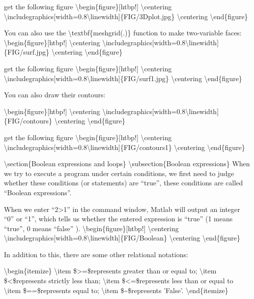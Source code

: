 \documentclass[10pt,math=newtx,citestyle=gb7714-2015,bibstyle=gb7714-2015]{elegantbook}
\begin{document}
	get the following figure
	\textbackslash{}begin\{figure\}[htbp!]
	\textbackslash{}centering
	\textbackslash{}includegraphics[width=0.8\textbackslash{}linewidth]\{FIG/3Dplot.jpg\}
	\textbackslash{}centering
	\textbackslash{}end\{figure\}
	
	You can also use the \textbackslash{}textbf\{meshgrid(.)\} function to make two-variable faces:
	\textbackslash{}begin\{figure\}[htbp!]
	\textbackslash{}centering
	\textbackslash{}includegraphics[width=0.8\textbackslash{}linewidth]\{FIG/surf.jpg\}
	\textbackslash{}centering
	\textbackslash{}end\{figure\}
	
	get the following figure
	\textbackslash{}begin\{figure\}[htbp!]
	\textbackslash{}centering
	\textbackslash{}includegraphics[width=0.8\textbackslash{}linewidth]\{FIG/surf1.jpg\}
	\textbackslash{}centering
	\textbackslash{}end\{figure\}
	
	You can also draw their contours:
	
	\textbackslash{}begin\{figure\}[htbp!]
	\textbackslash{}centering
	\textbackslash{}includegraphics[width=0.8\textbackslash{}linewidth]\{FIG/contours\}
	\textbackslash{}centering
	\textbackslash{}end\{figure\}
	
	get the following figure
	\textbackslash{}begin\{figure\}[htbp!]
	\textbackslash{}centering
	\textbackslash{}includegraphics[width=0.8\textbackslash{}linewidth]\{FIG/contours1\}
	\textbackslash{}centering
	\textbackslash{}end\{figure\}
	
	\textbackslash{}section\{Boolean expressions and loops\}
	\textbackslash{}subsection\{Boolean expressions\}
	When we try to execute a program under certain conditions, we first need to judge whether these conditions (or statements) are ``true'', these conditions are called ``Boolean expressions''.
	
	When we enter ``2>1'' in the command window, Matlab will output an integer ``0'' or ``1'', which tells us whether the entered expression is ``true'' (1 means ``true'', 0 means ``false'' ).
	\textbackslash{}begin\{figure\}[htbp!]
	\textbackslash{}centering
	\textbackslash{}includegraphics[width=0.8\textbackslash{}linewidth]\{FIG/Boolean\}
	\textbackslash{}centering
	\textbackslash{}end\{figure\}
	
	In addition to this, there are some other relational notations:
	
	\textbackslash{}begin\{itemize\}
	\textbackslash{}item \$>=\$represents greater than or equal to;
	\textbackslash{}item \$<\$represents strictly less than;
	\textbackslash{}item \$<=\$represents less than or equal to
	\textbackslash{}item \$==\$represents equal to;
	\textbackslash{}item \$\~{}\$represents 'False'.
	\textbackslash{}end\{itemize\}
	
\end{document}
